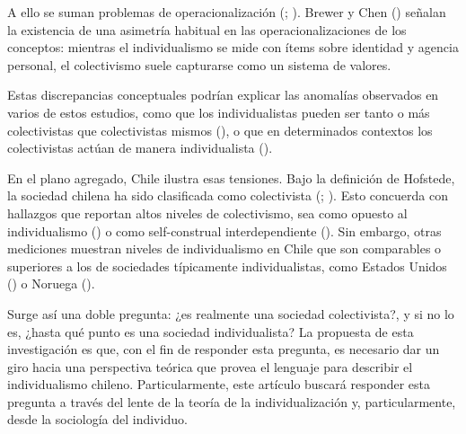\documentclass[
  letterpaper,
  DIV=11,
  numbers=noendperiod]{scrartcl}
\begin{document}
A ello se suman problemas de operacionalización
(;
). Brewer
y Chen () señalan la existencia de una
asimetría habitual en las operacionalizaciones de los conceptos:
mientras el individualismo se mide con ítems sobre identidad y agencia
personal, el colectivismo suele capturarse como un sistema de valores.

Estas discrepancias conceptuales podrían explicar las anomalías
observados en varios de estos estudios, como que los individualistas
pueden ser tanto o más colectivistas que colectivistas mismos
(), o que
en determinados contextos los colectivistas actúan de manera
individualista ().

En el plano agregado, Chile ilustra esas tensiones. Bajo la definición
de Hofstede, la sociedad chilena ha sido clasificada como colectivista
(; ). Esto concuerda con hallazgos que reportan altos niveles de
colectivismo, sea como opuesto al individualismo
() o como
self-construal interdependiente (). Sin embargo, otras mediciones muestran niveles de
individualismo en Chile que son comparables o superiores a los de
sociedades típicamente individualistas, como Estados Unidos
() o
Noruega ().

Surge así una doble pregunta: ¿es realmente una sociedad colectivista?,
y si no lo es, ¿hasta qué punto es una sociedad individualista? La
propuesta de esta investigación es que, con el fin de responder esta
pregunta, es necesario dar un giro hacia una perspectiva teórica que
provea el lenguaje para describir el individualismo chileno.
Particularmente, este artículo buscará responder esta pregunta a través
del lente de la teoría de la individualización y, particularmente, desde
la sociología del individuo.
\end{document}
